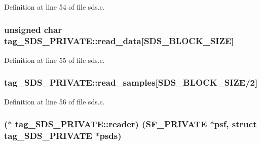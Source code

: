 Definition at line 54 of file sds.\+c.

\subsubsection[{\texorpdfstring{read\+\_\+data}{read_data}}]{\setlength{\rightskip}{0pt plus 5cm}unsigned char tag\+\_\+\+S\+D\+S\+\_\+\+P\+R\+I\+V\+A\+T\+E\+::read\+\_\+data\mbox{[}{\bf S\+D\+S\+\_\+\+B\+L\+O\+C\+K\+\_\+\+S\+I\+ZE}\mbox{]}}\hypertarget{structtag___s_d_s___p_r_i_v_a_t_e_a2a0fdc8dca595c05cc45ca8dd79b6fe6}{}\label{structtag___s_d_s___p_r_i_v_a_t_e_a2a0fdc8dca595c05cc45ca8dd79b6fe6}


Definition at line 55 of file sds.\+c.

\subsubsection[{\texorpdfstring{read\+\_\+samples}{read_samples}}]{ tag\+\_\+\+S\+D\+S\+\_\+\+P\+R\+I\+V\+A\+T\+E\+::read\+\_\+samples\mbox{[}{\bf S\+D\+S\+\_\+\+B\+L\+O\+C\+K\+\_\+\+S\+I\+ZE}/2\mbox{]}}\hypertarget{structtag___s_d_s___p_r_i_v_a_t_e_ae7cdb27a7b8c1ed4789c5d50705fd6e0}{}\label{structtag___s_d_s___p_r_i_v_a_t_e_ae7cdb27a7b8c1ed4789c5d50705fd6e0}


Definition at line 56 of file sds.\+c.

\subsubsection[{\texorpdfstring{reader}{reader}}]{($\ast$ tag\+\_\+\+S\+D\+S\+\_\+\+P\+R\+I\+V\+A\+T\+E\+::reader) ({\bf S\+F\+\_\+\+P\+R\+I\+V\+A\+TE} $\ast$psf, struct {\bf tag\+\_\+\+S\+D\+S\+\_\+\+P\+R\+I\+V\+A\+TE} $\ast$psds)}\hypertarget{structtag___s_d_s___p_r_i_v_a_t_e_a787ef91048491238f71a1644458a50b3}{}\label{structtag___s_d_s___p_r_i_v_a_t_e_a787ef91048491238f71a1644458a50b3}


